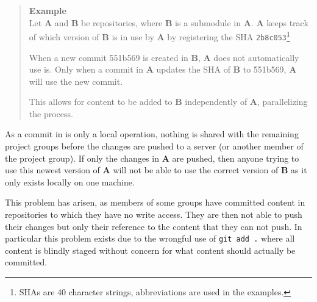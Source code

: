 \begin{quote}
\textbf{Example}\\
Let \textbf{A} and \textbf{B} be repositories, where \textbf{B} is a submodule in \textbf{A}.
\textbf{A} keeps track of which version of \textbf{B} is in use by \textbf{A} by registering the SHA \texttt{2b8c053}\footnote{\Git{} SHAs are 40 character strings, abbreviations are used in the examples.}

When a new commit 551b569 is created in \textbf{B}, \textbf{A} does not automatically use is.
Only when a commit in \textbf{A} updates the SHA of \textbf{B} to 551b569, \textbf{A} will use the new commit.

This allows for content to be added to \textbf{B} independently of \textbf{A}, parallelizing the process.
\end{quote}

As a commit in \git{} is only a local operation, nothing is shared with the remaining project groups before the changes are pushed to a server (or another member of the project group).
If only the changes in \textbf{A} are pushed, then anyone trying to use this newest version of \textbf{A} will not be able to use the correct version of \textbf{B} as it only exists locally on one machine.

This problem has arisen, as members of some groups have committed content in repositories to which they have no write access.
They are then not able to push their changes but only their reference to the content that they can not push.
In particular this problem exists due to the wrongful use of \texttt{git add .} where all content is blindly staged without concern for what content should actually be committed.

